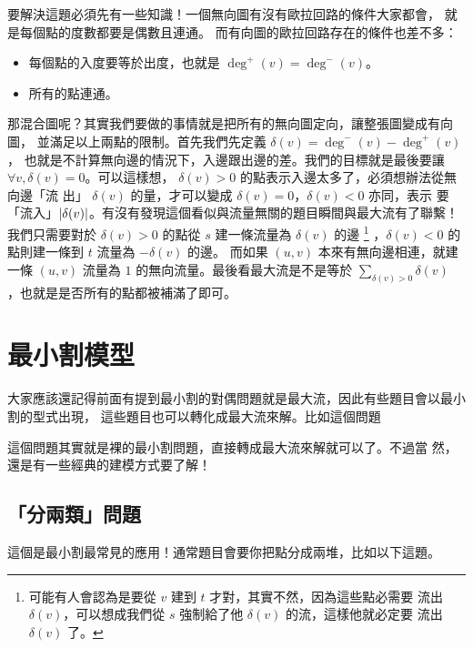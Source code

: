 \documentclass[a4paper,12pt]{book}
\begin{document}
要解決這題必須先有一些知識！一個無向圖有沒有歐拉回路的條件大家都會，
就是每個點的度數都要是偶數且連通。 而有向圖的歐拉回路存在的條件也差不多：
\begin{itemize}
  \item 每個點的入度要等於出度，也就是 $\deg^+(v) = \deg^-(v)$。
  \item 所有的點連通。
\end{itemize}
那混合圖呢？其實我們要做的事情就是把所有的無向圖定向，讓整張圖變成有向圖，
並滿足以上兩點的限制。首先我們先定義 $\delta(v) = \deg^-(v) - \deg^+(v)$，
也就是不計算無向邊的情況下，入邊跟出邊的差。我們的目標就是最後要讓 $\forall v, \delta(v) = 0
$。可以這樣想， $\delta(v) > 0$ 的點表示入邊太多了，必須想辦法從無向邊「流
出」 $\delta(v)$ 的量，才可以變成 $\delta(v) = 0$，$\delta(v) < 0$ 亦同，表示
要「流入」$\lvert \delta(v) \rvert$。有沒有發現這個看似與流量無關的題目瞬間與最大流有了聯繫！
我們只需要對於 $\delta(v) > 0$ 的點從 $s$ 建一條流量為 $\delta(v)$ 的邊
\footnote{可能有人會認為是要從 $v$ 建到 $t$ 才對，其實不然，因為這些點必需要
  流出 $\delta(v)$，可以想成我們從 $s$ 強制給了他 $\delta(v)$ 的流，這樣他就必定要
  流出 $\delta(v)$ 了。}
，$\delta(v) < 0$ 的點則建一條到 $t$ 流量為 $-\delta(v)$ 的邊。
而如果 $(u, v)$ 本來有無向邊相連，就建
一條 $(u, v)$ 流量為 $1$ 的無向流量。最後看最大流是不是等於 $\sum_{\delta(v) > 0} \delta(v)$ 
，也就是是否所有的點都被補滿了即可。

\section{最小割模型}
大家應該還記得前面有提到最小割的對偶問題就是最大流，因此有些題目會以最小割的型式出現，
這些題目也可以轉化成最大流來解。比如這個問題


這個問題其實就是裸的最小割問題，直接轉成最大流來解就可以了。不過當
然，還是有一些經典的建模方式要了解！

\subsection{「分兩類」問題}
這個是最小割最常見的應用！通常題目會要你把點分成兩堆，比如以下這題。
\end{document}

